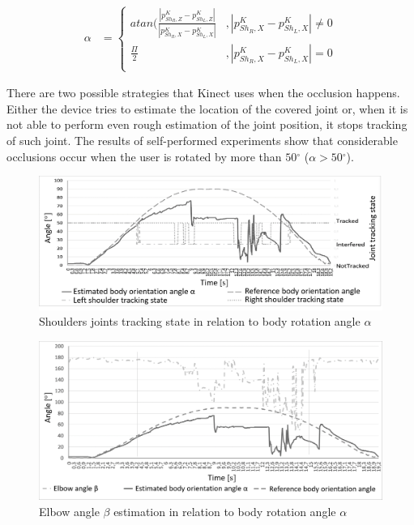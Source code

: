 \documentclass[sensors,article,submit,moreauthors,pdftex,10pt,a4paper]{mdpi}
\newcommand{\degree}{\ensuremath{{}^{\circ}}\xspace}
\begin{document}
\begin{equation}
	\label{eq:kinect:bodyRotationAngle}
	\begin{split}
		\alpha &= 
		\begin{cases} 
			atan(\frac{|p^K_{{Sh}_R,Z} - p^K_{{Sh}_L,Z}|}{|p^K_{{Sh}_R,X} - p^K_{{Sh}_L,X}|} & , |p^K_{{Sh}_R,X} - p^K_{{Sh}_L,X}| \neq 0 \\
			\frac{\Pi}{2}                                                                    & , |p^K_{{Sh}_R,X} - p^K_{{Sh}_L,X}| = 0    \\		
		\end{cases}
	\end{split}
\end{equation}

There are two possible strategies that Kinect uses when the occlusion happens. Either the device tries to estimate the location of the covered joint or, when it is not able to perform even rough estimation of the joint position, it stops tracking of such joint. The results of self-performed experiments show that considerable occlusions occur when the user is rotated by more than $50\degree$ ($\alpha > 50\degree$). 

\begin{figure}[H]
	\centering
	\includegraphics[width=12cm]{Figure4.png}
	\caption{Shoulders joints tracking state in relation to body rotation angle $\alpha$}
	\label{fig:kinect:trackingVsAlpha}
\end{figure}

\begin{figure}[H]
	\centering
	\includegraphics[width=12cm]{Figure5.png}
	\caption{Elbow angle $\beta$ estimation in relation to body rotation angle $\alpha$}
	\label{fig:kinect:betaVsAlpha}
\end{figure}
\end{document}
